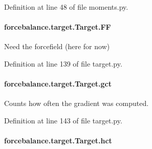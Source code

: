 Definition at line 48 of file moments.\-py.

\hypertarget{classforcebalance_1_1target_1_1Target_a38a37919783141ea37fdcf8b00ce0aaf}{
\paragraph[{F\-F}]{\setlength{\rightskip}{0pt plus 5cm}forcebalance.\-target.\-Target.\-F\-F\hspace{0.3cm}{\ttfamily [inherited]}}}\label{classforcebalance_1_1target_1_1Target_a38a37919783141ea37fdcf8b00ce0aaf}


Need the forcefield (here for now) 



Definition at line 139 of file target.\-py.

\hypertarget{classforcebalance_1_1target_1_1Target_aa625ac88c6744eb14ef281d9496d0dbb}{
\paragraph[{gct}]{\setlength{\rightskip}{0pt plus 5cm}forcebalance.\-target.\-Target.\-gct\hspace{0.3cm}{\ttfamily [inherited]}}}\label{classforcebalance_1_1target_1_1Target_aa625ac88c6744eb14ef281d9496d0dbb}


Counts how often the gradient was computed. 



Definition at line 143 of file target.\-py.

\hypertarget{classforcebalance_1_1target_1_1Target_a5b5a42f78052b47f29ed4b940c6111a1}{
\paragraph[{hct}]{\setlength{\rightskip}{0pt plus 5cm}forcebalance.\-target.\-Target.\-hct\hspace{0.3cm}{\ttfamily [inherited]}}}\label{classforcebalance_1_1target_1_1Target_a5b5a42f78052b47f29ed4b940c6111a1}


